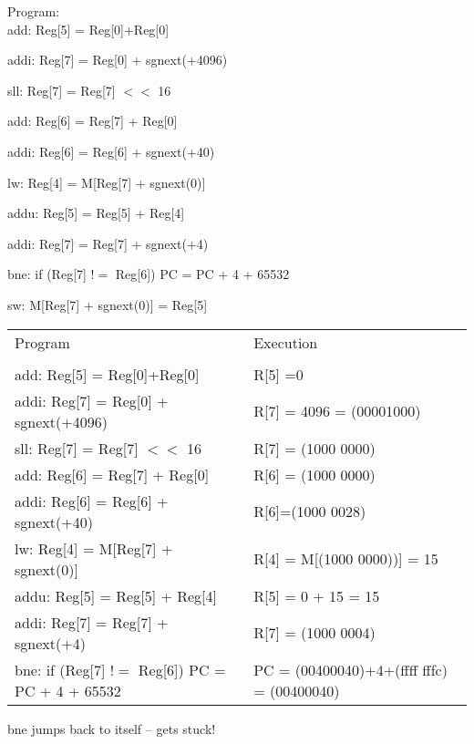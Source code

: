 \documentclass[11pt]{article}   	%
\begin{document}
\vspace{5mm}

Program:\\

add: Reg[5] = Reg[0]+Reg[0]

addi: Reg[7] = Reg[0] + sgnext(+4096)

sll: Reg[7] = Reg[7] $<<$ 16

add: Reg[6] = Reg[7] + Reg[0]

addi: Reg[6] = Reg[6] + sgnext(+40)

lw: Reg[4] = M[Reg[7] + sgnext(0)]

addu: Reg[5] = Reg[5] + Reg[4] 

addi: Reg[7] = Reg[7] + sgnext(+4)

bne: if (Reg[7] $!=$ Reg[6]) PC = PC + 4 + 65532

sw: M[Reg[7] + sgnext(0)] = Reg[5]



\newpage

\begin{table}[!htbp]
\begin{tabular}{ll}
Program & Execution\\
&\\
add: Reg[5] = Reg[0]+Reg[0] & R[5] =0 \\

addi: Reg[7] = Reg[0] + sgnext(+4096) & R[7] = 4096 = (00001000)\\

sll: Reg[7] = Reg[7] $<<$ 16  & R[7] = (1000 0000)\\

add: Reg[6] = Reg[7] + Reg[0] &  R[6] = (1000 0000) \\

addi: Reg[6] = Reg[6] + sgnext(+40) & R[6]=(1000 0028)\\

lw: Reg[4] = M[Reg[7] + sgnext(0)]  & R[4] = M[(1000 0000))] = 15 \\

addu: Reg[5] = Reg[5] + Reg[4] & R[5] = 0 + 15 = 15 \\

addi: Reg[7] = Reg[7] + sgnext(+4) & R[7] = (1000 0004)\\

bne: if (Reg[7] $!=$ Reg[6]) PC = PC + 4 + 65532 & PC = (00400040)+4+(ffff fffc) = (00400040)\\


\end{tabular}
\end{table}

{\color{blue} bne jumps back to itself -- gets stuck!}
\end{document}
